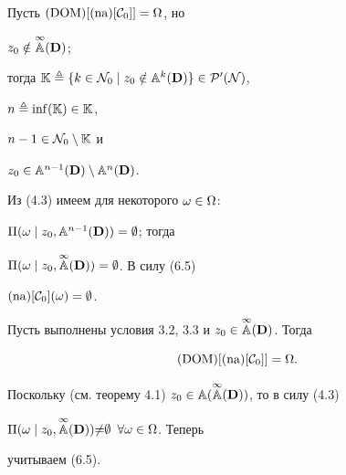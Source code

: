 \begin{pf}


Пусть $(\operatorname{DOM})[(\operatorname{na})[{\cal C}_0]] = \Omega$, но


${z_0} \notin \overset{\infty}{\Bbb A}{}({\bold D})$;


тогда ${\Bbb K} \stac \{k \in {{\cal N}_0}


\mid {z_0} \notin {{\Bbb A}^k}({\bold D})\} \in {{\cal P}'({\cal N})}$,


$n \triangleq {{\inf}({\Bbb K})} \in {\Bbb K}$,


$n - 1 \in {{\cal N}_0} \setminus {\Bbb K}$ и


${z_0} \in {{\Bbb A}^{n-1}}({\bold D}) \setminus {{\Bbb A}^n}({\bold D})$.


Из (4.3) имеем для некоторого $\omega \in \Omega$:


${\Pi}(\omega \mid {z_0},{{\Bbb A}^{n-1}}({\bold D})) = \emptyset$; тогда


${\Pi}(\omega \mid {z_0},


\up{\infty}{\Bbb A}({\bold D})) = \emp$. В силу (6.5)


$(\operatorname{na})[{\cal C}_0](\omega) = \emptyset$.


\end{pf}





\begin{props}


Пусть выполнены условия $3.2$, $3.3$ и ${z_0} \in


\up{\infty}{\Bbb A}({\bold D})$. Тогда


$$


(\DOM)[(\na)[{\cal C}_0]] = \Om.


$$


\end{props}





\begin{pf}


Поскольку (см. теорему 4.1) ${z_0} \in


{\Bbb A}(\up{\infty}{\Bbb A}({\bold D}))$, то в силу (4.3)


${\Pi}(\omega \mid {z_0},


\up{\infty}{\Bbb A}({\bold D})){\ne}\emp$ $\fo{\omega} \in \Om$. Теперь


учитываем (6.5).


\end{pf}





